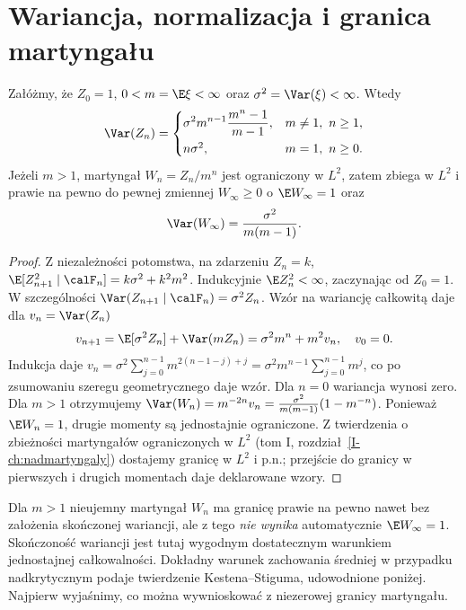 \section{Wariancja, normalizacja i granica martyngału}
\begin{twierdzenie}
Załóżmy, że $Z_0=1$, $0<m=\E\xi<\infty$ oraz
$\sigma^2=\Var(\xi)<\infty$. Wtedy
\[
\Var(Z_n)=
\begin{cases}
\displaystyle \sigma^2m^{n-1}\frac{m^n-1}{m-1},&m\ne1,\ n\ge1,\\[6pt]
 n\sigma^2,&m=1,\ n\ge0.
\end{cases}
\]
Jeżeli $m>1$, martyngał $W_n=Z_n/m^n$ jest ograniczony
w $L^2$, zatem zbiega w $L^2$ i prawie na pewno do
pewnej zmiennej $W_\infty\ge0$ o $\E W_\infty=1$ oraz
\[
\Var(W_\infty)=\frac{\sigma^2}{m(m-1)}.
\]
\end{twierdzenie}
\begin{proof}
Z niezależności potomstwa, na zdarzeniu $Z_n=k$,
$\E[Z_{n+1}^2\mid\calF_n]=k\sigma^2+k^2m^2$.
Indukcyjnie $\E Z_n^2<\infty$, zaczynając od $Z_0=1$.
W szczególności
$\Var(Z_{n+1}\mid\calF_n)=\sigma^2Z_n$.
Wzór na wariancję całkowitą daje dla $v_n=\Var(Z_n)$
\[
v_{n+1}=\E[\sigma^2Z_n]
+\Var(mZ_n)=\sigma^2m^n+m^2v_n,
\quad v_0=0.
\]
Indukcja daje
$v_n=\sigma^2\sum_{j=0}^{n-1}m^{2(n-1-j)+j}
=\sigma^2m^{n-1}\sum_{j=0}^{n-1}m^j$,
co po zsumowaniu szeregu geometrycznego daje wzór.
Dla $n=0$ wariancja wynosi zero. Dla $m>1$ otrzymujemy
$\Var(W_n)=m^{-2n}v_n
=\frac{\sigma^2}{m(m-1)}(1-m^{-n})$.
Ponieważ $\E W_n=1$, drugie momenty są jednostajnie
ograniczone. Z twierdzenia o zbieżności martyngałów
ograniczonych w $L^2$ (tom I,
rozdział~\ref{I-ch:nadmartyngaly}) dostajemy granicę w $L^2$ i p.n.;
przejście do granicy w pierwszych i drugich momentach daje
deklarowane wzory.
\end{proof}

\begin{uwaga}
Dla $m>1$ nieujemny martyngał $W_n$ ma granicę prawie na pewno
nawet bez założenia skończonej wariancji, ale z tego
\emph{nie wynika} automatycznie $\E W_\infty=1$.
Skończoność wariancji jest tutaj wygodnym dostatecznym
warunkiem jednostajnej całkowalności. Dokładny warunek zachowania średniej w przypadku
nadkrytycznym podaje twierdzenie Kestena--Stiguma,
udowodnione poniżej. Najpierw wyjaśnimy, co można
wywnioskować z niezerowej granicy martyngału.
\end{uwaga}

